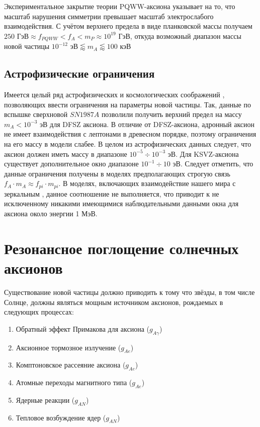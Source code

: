 \documentclass[a4paper,article,14pt]{extarticle}
\begin{document}
Экспериментальное закрытие теории PQWW-аксиона указывает на то, что масштаб нарушения симметрии превышает масштаб электрослабого взаимодействия. С учётом верхнего предела в виде планковской массы получаем $250 \text{ ГэВ} \approx f_{PQWW} < f_A < m_P \approx 10^{19} \text{ ГэВ} $, откуда возможный диапазон массы новой частицы $ 10^{-12} \text{ эВ} \lessapprox m_A \lessapprox 100 \text{ кэВ} $

\subsection{Астрофизические ограничения}

Имеется целый ряд астрофизических и космологических соображений \cite{turner1990windows, Raffelt:1995ym, raffelt1990astrophysical}, позволяющих ввести ограничения на параметры новой частицы. Так, данные по вспышке сверхновой $SN1987A$ позволили получить верхний предел на массу $m_A < 10^{-3} \text{ эВ}$ для DFSZ аксиона. В отличие от DFSZ-аксиона, адронный аксион не имеет взаимодействия с лептонами в древесном порядке, поэтому ограничения на его массу в модели слабее. В целом из астрофизических данных следует, что аксион должен иметь массу в диапазоне $10^{-5} \div 10^{-3} \text{ эВ}$. Для KSVZ-аксиона существует дополнительное окно диапазоне $10^{-1} \div 10 \text{ эВ}$. Следует отметить, что данные ограничения получены в моделях предполагающих строгую связь $f_A \cdot m_A \approx f_{pi} \cdot m_{pi}$. В моделях, включающих взаимодействие нашего мира с зеркальным \cite{berezhiani2001strong}, данное соотношение не выполняется, что приводит к не исключенному никакими имеющимися наблюдательными данными окна для аксиона около энергии 1 МэВ.

\section{Резонансное поглощение солнечных аксионов}


Существование новой частицы должно приводить к тому что звёзды, в том числе Солнце, должны являться мощным источником аксионов, рождаемых в следующих процессах:

\begin{enumerate}
    \item Обратный эффект Примакова для аксиона ($g_{A\gamma}$)
    \item Аксионное тормозное излучение ($g_{Ae}$)
    \item Комптоновское рассеяние аксиона ($g_{Ae}$)
    \item Атомные переходы магнитного типа ($g_{Ae}$)
    \item Ядерные реакции ($g_{AN}$)
    \item Тепловое возбуждение ядер ($g_{AN}$)
\end{enumerate}
\end{document}
